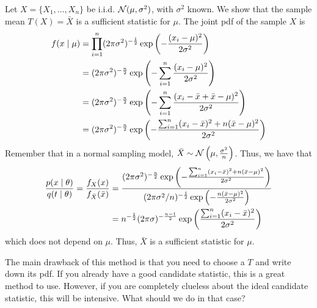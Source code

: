 \documentclass[10pt]{article}
\begin{document}
\begin{example}
	Let $X = \{X_1,\dots,X_n\}$ be i.i.d. $\mathcal{N}(\mu,\sigma^2)$, with $\sigma^2$ known. We show that the sample mean $T(X) = \bar{X}$ is a sufficient statistic for $\mu$. The joint pdf of the sample $X$ is
	\begin{align*}
		f(x \mid \mu) &= \prod_{i=1}^n (2\pi \sigma^2)^{-\frac{1}{2}} \exp \left( -\frac{(x_i - \mu)^2}{2\sigma^2}\right) \\
		&= (2\pi \sigma^2)^{-\frac{n}{2}}\exp \left( - \sum_{i=1}^n \frac{(x_i - \mu)^2}{2\sigma^2}\right) \\
		&= (2\pi \sigma^2)^{-\frac{n}{2}}\exp \left( - \sum_{i=1}^n \frac{(x_i - \bar{x} + \bar{x} - \mu)^2}{2\sigma^2}\right) \\
		&= (2\pi \sigma^2)^{-\frac{n}{2}} \exp \left( - \frac{\sum_{i=1}^n (x_i - \bar{x})^2 + n(\bar{x} - \mu)^2}{2\sigma^2} \right)
	\end{align*}
	Remember that in a normal sampling model, $\bar{X} \sim \mathcal{N}\left(\mu, \frac{\sigma^2}{n}\right)$. Thus, we have that
	\begin{align*}
		\frac{p(x \mid \theta)}{q(t \mid \theta)} = \frac{f_X(x)}{f_{\bar{X}}(\bar{x})} &= \frac{(2\pi \sigma^2)^{-\frac{n}{2}} \exp \left( - \frac{\sum_{i=1}^n (x_i - \bar{x})^2 + n(\bar{x} - \mu)^2}{2\sigma^2} \right)}{(2\pi \sigma^2 / n)^{-\frac{1}{2}} \exp \left( - \frac{n(\bar{x} - \mu)^2}{2\sigma^2}\right)} \\
		&= n^{-\frac{1}{2}} (2\pi\sigma)^{-\frac{n-1}{2}} \exp \left( \frac{\sum_{i=1}^n (x_i - \bar{x})^2}{2\sigma^2} \right)
	\end{align*}
	which does not depend on $\mu$. Thus, $\bar{X}$ is a sufficient statistic for $\mu$.
\end{example}

\begin{remark}
	The main drawback of this method is that you need to choose a $T$ and write down its pdf. If you already have a good candidate statistic, this is a great method to use. However, if you are completely clueless about the ideal candidate statistic, this will be intensive. What should we do in that case?
\end{remark}
\end{document}
